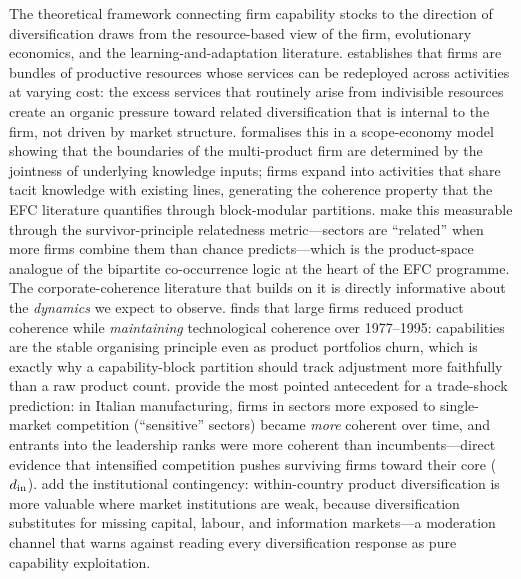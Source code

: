 The theoretical framework connecting firm capability stocks to the direction of
diversification draws from the resource-based view of the firm, evolutionary economics,
and the learning-and-adaptation literature. \citet{penrose1959} establishes that
firms are bundles of productive resources whose services can be redeployed across
activities at varying cost: the excess services that routinely arise from indivisible
resources create an organic pressure toward related diversification that is internal
to the firm, not driven by market structure. \citet{teece1982} formalises this in a
scope-economy model showing that the boundaries of the multi-product firm are
determined by the jointness of underlying knowledge inputs; firms expand into activities
that share tacit knowledge with existing lines, generating the coherence property
that the EFC literature quantifies through block-modular partitions.
\citet{teece1994} make this measurable through the survivor-principle relatedness
metric---sectors are ``related'' when more firms combine them than chance predicts---which
is the product-space analogue of the bipartite co-occurrence logic at the heart of the
EFC programme. The corporate-coherence literature that builds on it is directly
informative about the \emph{dynamics} we expect to observe. \citet{piscitello2000}
finds that large firms reduced product coherence while \emph{maintaining}
technological coherence over 1977--1995: capabilities are the stable organising
principle even as product portfolios churn, which is exactly why a capability-block
partition should track adjustment more faithfully than a raw product count.
\citet{valvano2003} provide the most pointed antecedent for a trade-shock prediction:
in Italian manufacturing, firms in sectors more exposed to single-market competition
(``sensitive'' sectors) became \emph{more} coherent over time, and entrants into the
leadership ranks were more coherent than incumbents---direct evidence that intensified
competition pushes surviving firms toward their core ($d_{\rm in}$). \citet{delios2008}
add the institutional contingency: within-country product diversification is more
valuable where market institutions are weak, because diversification substitutes for
missing capital, labour, and information markets---a moderation channel that warns
against reading every diversification response as pure capability exploitation.

